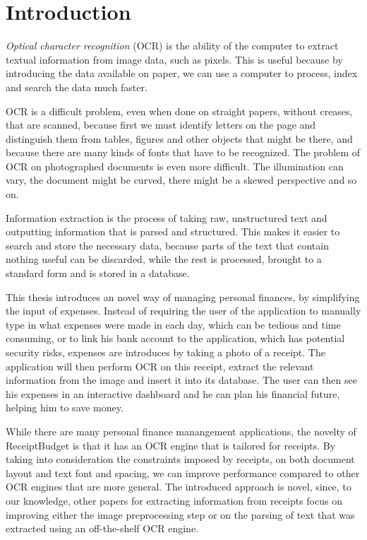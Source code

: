 \chapter{Introduction}
\textit{Optical character recognition} (OCR) is the ability of the computer to extract textual information from image data, such as pixels\cite{schantz1982history}. This is useful because by introducing the data available on paper, we can use a computer to process, index and search the data much faster.  

OCR is a difficult problem, even when done on straight papers, without creases, that are scanned, because first we must identify letters on the page and distinguish them from tables, figures and other objects that might be there, and because there are many kinds of fonts that have to be recognized. The problem of OCR on photographed documents is even more difficult. The illumination can vary, the document might be curved, there might be a skewed perspective and so on. 

Information extraction is the process of taking raw, unstructured text and outputting information that is parsed and structured. This makes it easier to search and store the necessary data, because parts of the text that contain nothing useful can be discarded, while the rest is processed, brought to a standard form and is stored in a database. 

This thesis introduces an novel way of managing personal finances, by simplifying the input of expenses. Instead of requiring the user of the application to manually type in what expenses were made in each day, which can be tedious and time consuming, or to link his bank account to the application, which has potential security risks, expenses are introduces by taking a photo of a receipt. The application will then perform OCR on this receipt, extract the relevant information from the image and insert it into its database. The user can then see his expenses in an interactive dashboard and he can plan his financial future, helping him to save money. 

While there are many personal finance manangement applications, the novelty of ReceiptBudget is that it has an OCR engine that is tailored for receipts. By taking into consideration the constraints imposed by receipts, on both document layout and text font and spacing, we can improve performance compared to other OCR engines that are more general. The introduced approach is novel, since, to our knowledge, other papers for extracting information from receipts focus on improving either the image preprocessing step or on the parsing of text that was extracted using an off-the-shelf OCR engine.


